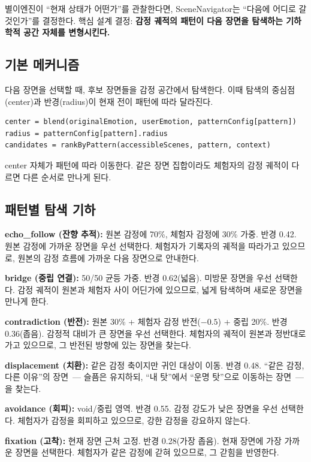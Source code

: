 \documentclass[11pt, a4paper]{article}
\begin{document}
별이엔진이 ``현재 상태가 어떤가''를 관찰한다면, SceneNavigator는 ``다음에 어디로 갈 것인가''를 결정한다. 핵심 설계 결정: \textbf{감정 궤적의 패턴이 다음 장면을 탐색하는 기하학적 공간 자체를 변형시킨다.}

\subsection{기본 메커니즘}

다음 장면을 선택할 때, 후보 장면들을 감정 공간에서 탐색한다. 이때 탐색의 중심점(center)과 반경(radius)이 현재 전이 패턴에 따라 달라진다.

\begin{lstlisting}
center = blend(originalEmotion, userEmotion, patternConfig[pattern])
radius = patternConfig[pattern].radius
candidates = rankByPattern(accessibleScenes, pattern, context)
\end{lstlisting}

center 자체가 패턴에 따라 이동한다. 같은 장면 집합이라도 체험자의 감정 궤적이 다르면 다른 순서로 만나게 된다.

\subsection{패턴별 탐색 기하}

\textbf{echo\_follow (잔향 추적):} 원본 감정에 70\%, 체험자 감정에 30\% 가중. 반경 0.42. 원본 감정에 가까운 장면을 우선 선택한다. 체험자가 기록자의 궤적을 따라가고 있으므로, 원본의 감정 흐름에 가까운 다음 장면으로 안내한다.

\textbf{bridge (중립 연결):} 50/50 균등 가중. 반경 0.62(넓음). 미방문 장면을 우선 선택한다. 감정 궤적이 원본과 체험자 사이 어딘가에 있으므로, 넓게 탐색하며 새로운 장면을 만나게 한다.

\textbf{contradiction (반전):} 원본 30\% + 체험자 감정 반전($-0.5$) + 중립 20\%. 반경 0.36(좁음). 감정적 대비가 큰 장면을 우선 선택한다. 체험자의 궤적이 원본과 정반대로 가고 있으므로, 그 반전된 방향에 있는 장면을 찾는다.

\textbf{displacement (치환):} 같은 감정 축이지만 귀인 대상이 이동. 반경 0.48. ``같은 감정, 다른 이유''의 장면~--- 슬픔은 유지하되, ``내 탓''에서 ``운명 탓''으로 이동하는 장면~--- 을 찾는다.

\textbf{avoidance (회피):} void/중립 영역. 반경 0.55. 감정 강도가 낮은 장면을 우선 선택한다. 체험자가 감정을 회피하고 있으므로, 강한 감정을 강요하지 않는다.

\textbf{fixation (고착):} 현재 장면 근처 고정. 반경 0.28(가장 좁음). 현재 장면에 가장 가까운 장면을 선택한다. 체험자가 같은 감정에 갇혀 있으므로, 그 갇힘을 반영한다.
\end{document}
